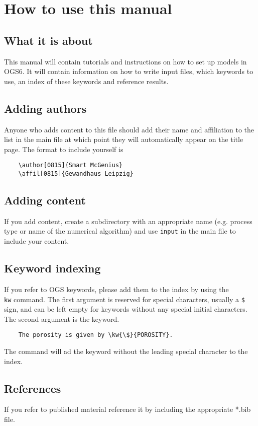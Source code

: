 \chapter{How to use this manual}

\section{What it is about}
This manual will contain tutorials and instructions on how to set up models in OGS6. It will contain information on how to write input files, which keywords to use, an index of these keywords and reference results.

\section{Adding authors}
Anyone who adds content to this file should add their name and affiliation to the list in the main file at which point they will automatically appear on the title page. The format to include yourself is 
\begin{verbatim}
	\author[0815]{Smart McGenius}
	\affil[0815]{Gewandhaus Leipzig}
\end{verbatim}

\section{Adding content}
If you add content, create a subdirectory with an appropriate name (e.g. process type or name of the numerical algorithm) and use \texttt{input} in the main file to include your content.

\section{Keyword indexing}
If you refer to OGS keywords, please add them to the index by using the \texttt{\\kw} command. The first argument is reserved for special characters, usually a \texttt{\$} sign, and can be left empty for keywords without any special initial characters. The second argument is the keyword.
\begin{verbatim}
	The porosity is given by \kw{\$}{POROSITY}. 
\end{verbatim}
The command will ad the keyword without the leading special character to the index.

\section{References}
If you refer to published material reference it by including the appropriate *.bib file.

